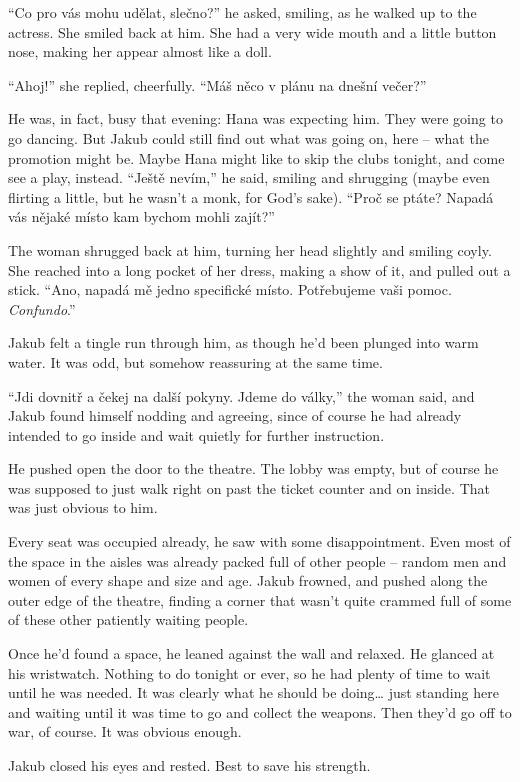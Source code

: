 ``Co pro vás mohu udělat, slečno?'' he asked, smiling, as he walked up
to the actress. She smiled back at him. She had a very wide mouth and a
little button nose, making her appear almost like a doll.

``Ahoj!'' she replied, cheerfully. ``Máš něco v plánu na dnešní večer?''

He was, in fact, busy that evening: Hana was expecting him. They were
going to go dancing. But Jakub could still find out what was going on,
here -- what the promotion might be. Maybe Hana might like to skip the
clubs tonight, and come see a play, instead. ``Ještě nevím,'' he said,
smiling and shrugging (maybe even flirting a little, but he wasn't a
monk, for God's sake). ``Proč se ptáte? Napadá vás nějaké místo kam
bychom mohli zajít?''

The woman shrugged back at him, turning her head slightly and smiling
coyly. She reached into a long pocket of her dress, making a show of it,
and pulled out a stick. ``Ano, napadá mě jedno specifické místo.
Potřebujeme vaši pomoc. \emph{Confundo}.''

Jakub felt a tingle run through him, as though he'd been plunged into
warm water. It was odd, but somehow reassuring at the same time.

``Jdi dovnitř a čekej na další pokyny. Jdeme do války,'' the woman said,
and Jakub found himself nodding and agreeing, since of course he had
already intended to go inside and wait quietly for further instruction.

He pushed open the door to the theatre. The lobby was empty, but of
course he was supposed to just walk right on past the ticket counter and
on inside. That was just obvious to him.

Every seat was occupied already, he saw with some disappointment. Even
most of the space in the aisles was already packed full of other people
-- random men and women of every shape and size and age. Jakub frowned,
and pushed along the outer edge of the theatre, finding a corner that
wasn't quite crammed full of some of these other patiently waiting
people.

Once he'd found a space, he leaned against the wall and relaxed. He
glanced at his wristwatch. Nothing to do tonight or ever, so he had
plenty of time to wait until he was needed. It was clearly what he
should be doing\ldots{} just standing here and waiting until it was time
to go and collect the weapons. Then they'd go off to war, of course. It
was obvious enough.

Jakub closed his eyes and rested. Best to save his strength.

